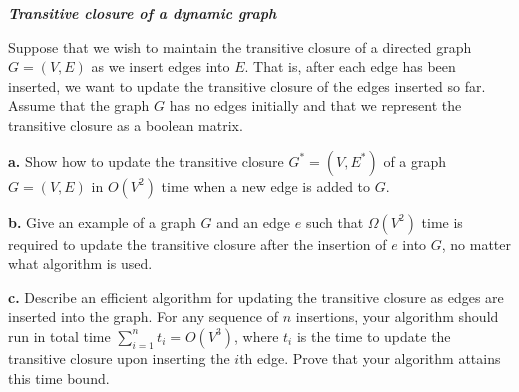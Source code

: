 \textit{\textbf{Transitive closure of a dynamic graph}}

Suppose that we wish to maintain the transitive closure of a directed graph $G=(V,E)$ as we insert edges into $E$.
That is, after each edge has been inserted, we want to update the transitive closure of the edges inserted so far. 
Assume that the graph $G$ has no edges initially and that we represent the transitive closure as a boolean matrix.

\textbf{a.} Show how to update the transitive closure $G^*=(V,E^*)$ of a graph $G=(V,E)$ in $O(V^2)$ time when a 
new edge is added to $G$.

\textbf{b.} Give an example of a graph $G$ and an edge $e$ such that $\Omega(V^2)$ time is required to update the 
transitive closure after the insertion of $e$ into $G$, no matter what algorithm is used.

\textbf{c.} Describe an efficient algorithm for updating the transitive closure as edges are inserted into the 
graph. For any sequence of $n$ insertions, your algorithm should run in total time $\sum_{i=1}^n{t_i} = O(V^3)$, 
where $t_i$ is the time to update the transitive closure upon inserting the $i$th edge. Prove that your algorithm 
attains this time bound.